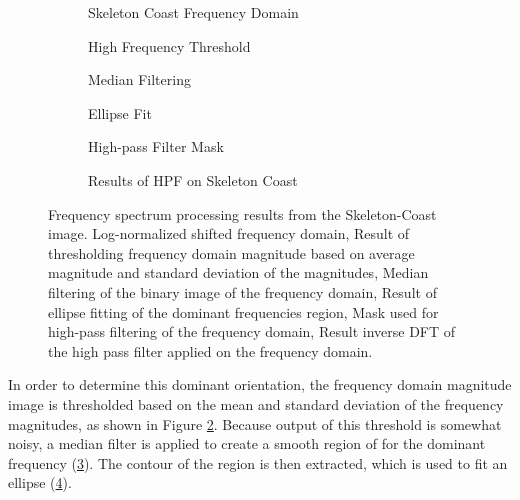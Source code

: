 \begin{figure}
	\centering
	\begin{subfigure}{0.48\textwidth}
		\centering
		\caption{Skeleton Coast Frequency Domain}
		\label{fig:dft_spectrum}
	\end{subfigure}
	\begin{subfigure}{0.48\textwidth}
		\centering
		\caption{High Frequency Threshold}
		\label{fig:DFT_spectrum_threshold}
	\end{subfigure}
	\begin{subfigure}{0.48\textwidth}
		\centering
		\caption{Median Filtering}
		\label{fig:DFT_spectrum_threshold_median}
	\end{subfigure}
	\begin{subfigure}{0.48\textwidth}
		\centering
		\caption{Ellipse Fit}
		\label{fig:DFT_spectrum_ellipsefit}
	\end{subfigure}
	\begin{subfigure}{0.48\textwidth}
		\centering
		\caption{High-pass Filter Mask}
		\label{fig:DFT_mask}
	\end{subfigure} 
	\begin{subfigure}{0.48\textwidth}
		\centering
		\caption{Results of HPF on Skeleton Coast} 
		\label{fig:DFT_HPF}
	\end{subfigure} 
	\caption{Frequency spectrum processing results from the Skeleton-Coast image.  Log-normalized shifted frequency domain,  Result of thresholding frequency domain magnitude based on average magnitude and standard deviation of the magnitudes,  Median filtering of the binary image of the frequency domain,  Result of ellipse fitting of the dominant frequencies region,  Mask used for high-pass filtering of the frequency domain,  Result inverse DFT of the high pass filter applied on the frequency domain. }
	\label{fig:DFT_processing}
\end{figure}

In order to determine this dominant orientation, the frequency domain magnitude image is thresholded based on the mean and standard deviation of the frequency magnitudes, as shown in Figure \ref{fig:DFT_spectrum_threshold}. Because output of this threshold is somewhat noisy, a median filter is applied to create a smooth region of for the dominant frequency (\ref{fig:DFT_spectrum_threshold_median}). The contour of the region is then extracted, which is used to fit an ellipse (\ref{fig:DFT_spectrum_ellipsefit}).

